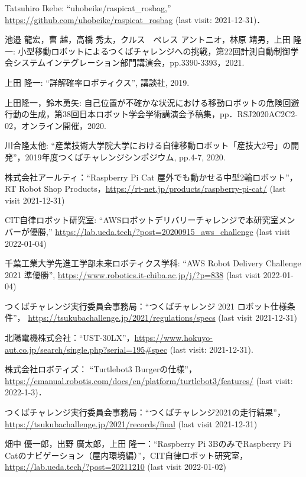 \documentclass[twocolumn,9pt]{jsproceedings}
\begin{document}
\begin{thebibliography}{99}
  Tatsuhiro Ikebe: ``uhobeike/raspicat\_rosbag,'' \url{https://github.com/uhobeike/raspicat_rosbag} (last visit: 2021-12-31)．


 池邉 龍宏，曹 越，高橋 秀太，クルス　ペレス アントニオ，林原 靖男，上田 隆一: 小型移動ロボットによるつくばチャレンジへの挑戦，第22回計測自動制御学会システムインテグレーション部門講演会，pp.3390-3393，2021.

上田 隆一: ``詳解確率ロボティクス'', 講談社, 2019.

 上田隆一，鈴木勇矢: 自己位置が不確かな状況における移動ロボットの危険回避行動の生成，第38回日本ロボット学会学術講演会予稿集，pp．RSJ2020AC2C2-02，オンライン開催，2020.

  川合隆太他: ``産業技術大学院大学における自律移動ロボット「産技大2号」の開発''，2019年度つくばチャレンジシンポジウム, pp.4-7, 2020.

  株式会社アールティ：``Raspberry Pi Cat 屋外でも動かせる中型2輪ロボット''，
  RT Robot Shop Products，\url{https://rt-net.jp/products/raspberry-pi-cat/} (last visit 2021-12-31)

	  CIT自律ロボット研究室: ``AWSロボットデリバリーチャレンジで本研究室メンバーが優勝,'' \url{https://lab.ueda.tech/?post=20200915_aws_challenge} (last visit 2022-01-04)

	  千葉工業大学先進工学部未来ロボティクス学科: ``AWS Robot Delivery Challenge 2021 準優勝'', \url{https://www.robotics.it-chiba.ac.jp/j/?p=838} (last visit 2022-01-04)
  
  つくばチャレンジ実行委員会事務局：``つくばチャレンジ 2021 ロボット仕様条件''，
  \url{https://tsukubachallenge.jp/2021/regulations/specs} (last visit 2021-12-31)
  
  北陽電機株式会社：``UST-30LX''，\url{https://www.hokuyo-aut.co.jp/search/single.php?serial=195#spec} (last visit: 2021-12-31).
  
  株式会社ロボティズ： ``Turtlebot3 Burgerの仕様''，\url{https://emanual.robotis.com/docs/en/platform/turtlebot3/features/} (last visit: 2022-1-3)．
  
  つくばチャレンジ実行委員会事務局：``つくばチャレンジ2021の走行結果''，
  \url{https://tsukubachallenge.jp/2021/records/final} (last visit 2021-12-31)

	  畑中 優一郎，出野 廣太郎，上田 隆一：``Raspberry Pi 3BのみでRaspberry Pi Catのナビゲーション（屋内環境編）''，CIT自律ロボット研究室，\url{https://lab.ueda.tech/?post=20211210} (last visit 2022-01-02)
\end{thebibliography}
\normalsize
\end{document}
